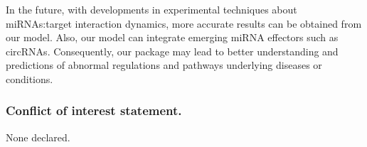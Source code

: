 \documentclass[a4,center,fleqn]{NAR}
\begin{document}
In the future, with developments in experimental techniques about
miRNAs:target interaction dynamics, more accurate results can be
obtained from our model. Also, our model can integrate emerging miRNA
effectors such as circRNAs. Consequently, our package may lead to better
understanding and predictions of abnormal regulations and pathways
underlying diseases or conditions.

\subsubsection{Conflict of interest statement.}

None declared.

\newpage



\end{document}
